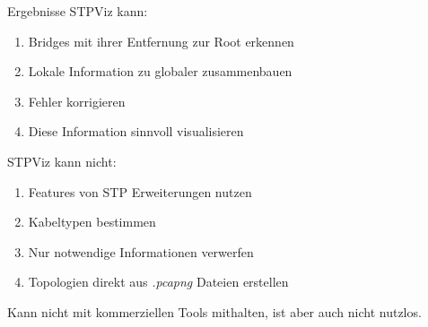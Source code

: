 \documentclass{beamer}
\begin{document}
\begin{frame}{Ergebnisse}
    STPViz kann:
    \begin{enumerate}[<+(1)->]
        \item Bridges mit ihrer Entfernung zur Root erkennen
        \item Lokale Information zu globaler zusammenbauen
        \item Fehler korrigieren
        \item Diese Information sinnvoll visualisieren
    \end{enumerate}
    \pause
    STPViz kann nicht:
    \begin{enumerate}[<+(1)->]
        \item Features von STP Erweiterungen nutzen
        \item Kabeltypen bestimmen
        \item Nur notwendige Informationen verwerfen
        \item Topologien direkt aus \textit{.pcapng} Dateien erstellen
    \end{enumerate}
    \pause
    \alert{Kann nicht mit kommerziellen Tools mithalten, ist aber auch nicht nutzlos.}
\end{frame}
\end{document}
